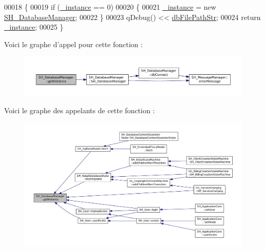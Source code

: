 \begin{DoxyCode}
00018 \{
00019     \textcolor{keywordflow}{if} (\hyperlink{classSH__DatabaseManager_a8ca37d0cafa6a181582d60e045a8d5ab}{\_instance} == 0)
00020     \{
00021         \hyperlink{classSH__DatabaseManager_a8ca37d0cafa6a181582d60e045a8d5ab}{\_instance} = \textcolor{keyword}{new} \hyperlink{classSH__DatabaseManager_a7b5d0e372c153eb59cdab98588994904}{SH\_DatabaseManager};
00022     \}
00023     qDebug() << \hyperlink{SH__DatabaseManager_8h_acee79beb6e5aec996fd46b84264d072a}{dbFilePathStr};
00024     \textcolor{keywordflow}{return} \hyperlink{classSH__DatabaseManager_a8ca37d0cafa6a181582d60e045a8d5ab}{\_instance};
00025 \}
\end{DoxyCode}


Voici le graphe d'appel pour cette fonction \-:\nopagebreak
\begin{figure}[H]
\begin{center}
\leavevmode
\includegraphics[width=350pt]{classSH__DatabaseManager_a638369a15265ab0aa053080a32d2ca39_cgraph}
\end{center}
\end{figure}




Voici le graphe des appelants de cette fonction \-:\nopagebreak
\begin{figure}[H]
\begin{center}
\leavevmode
\includegraphics[width=350pt]{classSH__DatabaseManager_a638369a15265ab0aa053080a32d2ca39_icgraph}
\end{center}
\end{figure}


